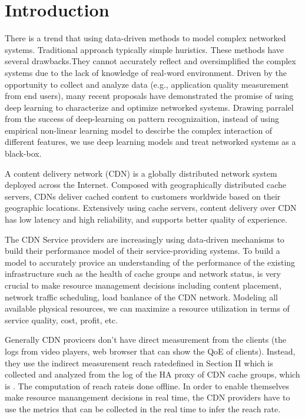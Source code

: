 \documentclass[5p]{elsarticle}
\newcommand{\dabiaolv}{reach rate}
\begin{document}
\section{Introduction}
There is a trend \cite{Jiang2017Pytheas:Exploration-Exploitation} \cite{Mao2017NeuralPensieve} that using data-driven methods to model complex networked systems. Traditional approach typically simple huristics. These methods have several drawbacks.They cannot accurately reflect and oversimplified the complex systems due to the lack of knowledge of real-word environment. Driven by the opportunity to collect and analyze data (e.g., application quality measurement from end users), many recent proposals have demonstrated the promise of using deep learning to characterize and optimize networked systems. Drawing parralel from the success of deep-learning on pattern recognizaition, instead of using empirical non-linear learning model to descirbe the complex interaction of different features, we use deep learning models and treat networked systems as a black-box.

A content delivery network (CDN) is a globally distributed network system deployed across the Internet. Composed with geographically distributed cache servers, CDNs deliver cached content  to  customers  worldwide  based  on their geographic locations. Extensively  using  cache  servers,  content  delivery over  CDN  has  low  latency  and  high  reliability,  and  supports better quality of experience.

The CDN Service providers are increasingly using data-driven mechanisms to build their performance model of their service-providing systems. To build a model to accurately provice an understanding of the performance of the existing infrastructure such as the health of cache groups and network status, is very crucial to make resource management decisions including content placement, network traffic scheduling, load banlance of the CDN network. Modeling all available physical resources, we can maximize a resource utilization in terms of service quality, cost, profit, etc.

Generally CDN provicers don't have direct measurement from the clients (the logs from video players, web browser that can show the QoE of clients). Instead, they use the indirect measurement \dabiaolv defined in Section II which is collected and analyzed from the log of the HA proxy of CDN cache groups, which is . The computation of \dabiaolv is done offline. In order to enable themselves make resource manangement decisions in real time, the CDN providers have to use the metrics that can be collected in the real time to infer the \dabiaolv. 
\end{document}
